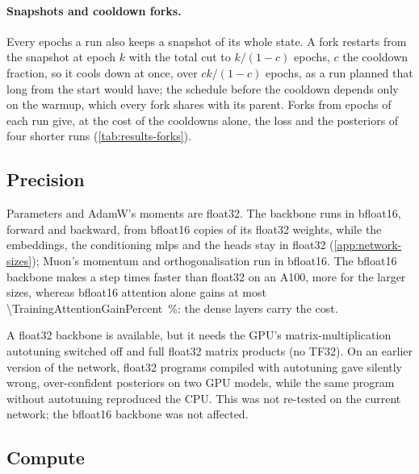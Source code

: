 \paragraph{Snapshots and cooldown forks.}
Every \ResultsSnapshotEvery{} epochs a run also keeps a snapshot of its whole state. A fork restarts from the snapshot at epoch $k$ with the total cut to
$k/(1-c)$ epochs, $c$ the cooldown fraction, so it cools down at once, over $ck/(1-c)$ epochs, as a
run planned that long from the start would have; the schedule before the cooldown depends only on
the warmup, which every fork shares with its parent. Forks from epochs \ResultsForkEpochs{} of each
run give, at the cost of the cooldowns alone, the loss and the posteriors of four shorter runs
(\cref{tab:results-forks}).

\subsection{Precision}
\label{app:training-precision}

Parameters and AdamW's moments are float32. The backbone runs in bfloat16, forward and backward,
from bfloat16 copies of its float32 weights, while the embeddings, the conditioning \acp{mlp} and
the heads stay in float32 (\cref{app:network-sizes}); Muon's momentum and orthogonalisation run in
bfloat16. The bfloat16 backbone makes a step \rev{\numrange{\TrainingBackboneSpeedupAMin}{\TrainingBackboneSpeedupAMax}}
times faster than float32 on an A100, more for the larger sizes, whereas bfloat16 attention alone
gains at most \qty{\TrainingAttentionGainPercent}{\percent}: the dense layers carry the cost.

A float32 backbone is available, but it needs the GPU's matrix-multiplication autotuning switched
off and full float32 matrix products (no TF32). On an earlier version of the network, float32
programs compiled with autotuning gave silently wrong, over-confident posteriors on two GPU models,
while the same program without autotuning reproduced the CPU. This was not re-tested on the current
network; the bfloat16 backbone was not affected.

\subsection{Compute}
\label{app:training-compute}

